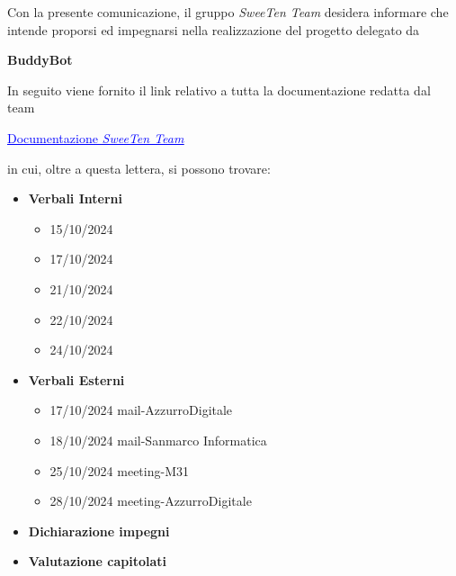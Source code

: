 \documentclass[italian, 11pt]{article}
\begin{document}
\pagestyle{mystyle}


\newpage

Con la presente comunicazione, il gruppo \textit{SweeTen Team} desidera informare che intende proporsi ed impegnarsi nella realizzazione del progetto delegato da \hspace{0.1em} 
\begin{center}
  \textbf{BuddyBot}
\end{center}
In seguito viene fornito il link relativo a tutta la documentazione redatta dal team
\begin{center}
  \href{https://github.com/SweeTenTeam/Docs}{\textcolor{blue}{\underline{Documentazione \textit{SweeTen Team}}}}
\end{center}
in cui, oltre a questa lettera, si possono trovare:
\begin{itemize}
    \item \textbf{Verbali Interni}
    \begin{itemize}
        \item 15/10/2024
        \item 17/10/2024
        \item 21/10/2024
        \item 22/10/2024
        \item 24/10/2024
    \end{itemize}
    
    \item \textbf{Verbali Esterni}
    \begin{itemize}
        \item 17/10/2024 mail-AzzurroDigitale
        \item 18/10/2024 mail-Sanmarco Informatica 
        \item 25/10/2024 meeting-M31
        \item 28/10/2024 meeting-AzzurroDigitale
    \end{itemize}
    \item \textbf{Dichiarazione impegni}
    \item \textbf{Valutazione capitolati}
\end{itemize}
\end{document}
